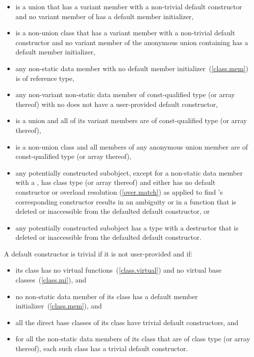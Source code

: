 \begin{itemize}
\item {} is a union that has a variant member
with a non-trivial default constructor and
no variant member of  has a default member initializer,
    
\item {} is a non-union class that has a variant member 
with a non-trivial default constructor and
no variant member of the anonymous union containing 
has a default member initializer,

\item any non-static data member with no default member initializer~(\ref{class.mem}) is
of reference type,

\item any non-variant non-static data member of const-qualified type (or array
thereof) with no  does not have a user-provided default constructor,

\item {} is a union and all of its variant members are of const-qualified
type (or array thereof),

\item {} is a non-union class and all members of any anonymous union member are
of const-qualified type (or array thereof),

\item any potentially constructed subobject, except for a non-static data member
with a , has
class type  (or array thereof) and either 
has no default constructor or overload resolution
(\ref{over.match}) as applied to find 's corresponding
constructor results in an ambiguity or in a function that is deleted or
inaccessible from the defaulted default constructor, or

\item any potentially constructed subobject has a type
with a destructor that is deleted or inaccessible from the defaulted default
constructor.
\end{itemize}

\pnum
A default constructor is
trivial
if it is not user-provided and if:

\begin{itemize}
\item
its class has no virtual functions~(\ref{class.virtual}) and no virtual base
classes~(\ref{class.mi}), and

\item no non-static data member of its class has
a default member initializer~(\ref{class.mem}), and

\item
all the direct base classes of its class have trivial default constructors, and

\item
for all the non-static data members of its class that are of class
type (or array thereof), each such class has a trivial default constructor.
\end{itemize}

